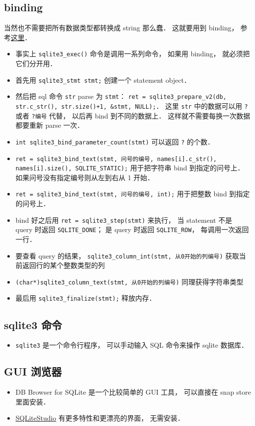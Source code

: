 \subsection{binding}
当然也不需要把所有数据类型都转换成 string 那么蠢． 这就要用到 binding， 参考\href{https://www.sqlite.org/c3ref/bind_blob.html}{这里}．
\begin{itemize}
\item 事实上 \verb|sqlite3_exec()| 命令是调用一系列命令， 如果用 binding， 就必须把它们分开用．
\item 首先用 \verb|sqlite3_stmt stmt;| 创建一个 statement object．
\item 然后把 sql 命令 \verb|str| parse 为 \verb|stmt|： \verb|ret = sqlite3_prepare_v2(db, str.c_str(), str.size()+1, &stmt, NULL);|． 这里 \verb|str| 中的数据可以用 \verb|?| 或者 \verb|?编号| 代替， 以后再 bind 到不同的数据上． 这样就不需要每换一次数据都要重新 parse 一次．
\item \verb|int sqlite3_bind_parameter_count(stmt)| 可以返回 \verb|?| 的个数．
\item \verb|ret = sqlite3_bind_text(stmt, 问号的编号, names[i].c_str(), names[i].size(), SQLITE_STATIC);| 用于把字符串 bind 到指定的问号上． 如果问号没有指定编号则从左到右从 1 开始．
\item \verb|ret = sqlite3_bind_text(stmt, 问号的编号, int);| 用于把整数 bind 到指定的问号上．
\item bind 好之后用 \verb|ret = sqlite3_step(stmt)| 来执行， 当 statement 不是 query 时返回 \verb|SQLITE_DONE|； 是 query 时返回 \verb|SQLITE_ROW|， 每调用一次返回一行．
\item 要查看 query 的结果， \verb|sqlite3_column_int(stmt, 从0开始的列编号)| 获取当前返回行的某个整数类型的列
\item \verb|(char*)sqlite3_column_text(stmt, 从0开始的列编号)| 同理获得字符串类型
\item 最后用 \verb|sqlite3_finalize(stmt);| 释放内存．
\end{itemize}


\subsection{sqlite3 命令}
\begin{itemize}
\item \verb|sqlite3| 是一个命令行程序， 可以手动输入 SQL 命令来操作 sqlite 数据库．
\end{itemize}

\subsection{GUI 浏览器}
\begin{itemize}
\item DB Browser for SQLite 是一个比较简单的 GUI 工具， 可以直接在 snap store 里面安装．
\item \href{https://sqlitestudio.pl/}{SQLiteStudio} 有更多特性和更漂亮的界面， 无需安装．
\end{itemize}
